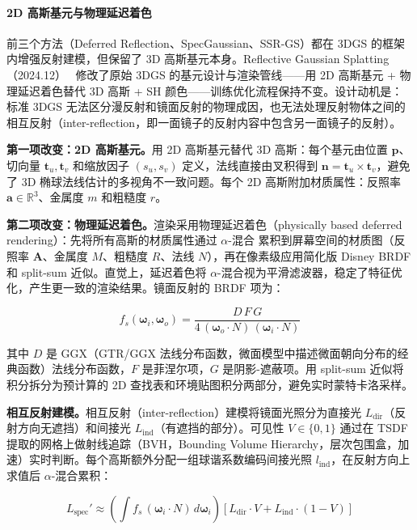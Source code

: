 \paragraph{2D 高斯基元与物理延迟着色}

前三个方法（Deferred Reflection、SpecGaussian、SSR-GS）都在 3DGS 的框架内增强反射建模，但保留了 3D 高斯基元本身。Reflective Gaussian Splatting（2024.12）~\cite{2412_19282} 修改了原始 3DGS 的基元设计与渲染管线——用 2D 高斯基元 + 物理延迟着色替代 3D 高斯 + SH 颜色——训练优化流程保持不变。设计动机是：标准 3DGS 无法区分漫反射和镜面反射的物理成因，也无法处理反射物体之间的相互反射（inter-reflection，即一面镜子的反射内容中包含另一面镜子的反射）。

\textbf{第一项改变：2D 高斯基元。}用 2D 高斯基元替代 3D 高斯：每个基元由位置 $\mathbf{p}$、切向量 $\mathbf{t}_u, \mathbf{t}_v$ 和缩放因子 $(s_u, s_v)$ 定义，法线直接由叉积得到 $\mathbf{n} = \mathbf{t}_u \times \mathbf{t}_v$，避免了 3D 椭球法线估计的多视角不一致问题。每个 2D 高斯附加材质属性：反照率 $\mathbf{a} \in \mathbb{R}^3$、金属度 $m$ 和粗糙度 $r$。

\textbf{第二项改变：物理延迟着色。}渲染采用物理延迟着色（physically based deferred rendering）：先将所有高斯的材质属性通过 $\alpha$-混合 累积到屏幕空间的材质图（反照率 $\mathbf{A}$、金属度 $M$、粗糙度 $R$、法线 $N$），再在像素级应用简化版 Disney BRDF 和 split-sum 近似。直觉上，延迟着色将 $\alpha$-混合视为平滑滤波器，稳定了特征优化，产生更一致的渲染结果。镜面反射的 BRDF 项为：

\begin{equation}
f_s(\boldsymbol{\omega}_i, \boldsymbol{\omega}_o) = \frac{D \, F \, G}{4 \, (\boldsymbol{\omega}_o \cdot N) \, (\boldsymbol{\omega}_i \cdot N)}
\end{equation}

其中 $D$ 是 GGX（GTR/GGX 法线分布函数，微面模型中描述微面朝向分布的经典函数）法线分布函数，$F$ 是菲涅尔项，$G$ 是阴影-遮蔽项。用 split-sum 近似将积分拆分为预计算的 2D 查找表和环境贴图积分两部分，避免实时蒙特卡洛采样。

\textbf{相互反射建模。}相互反射（inter-reflection）建模将镜面光照分为直接光 $L_{\text{dir}}$（反射方向无遮挡）和间接光 $L_{\text{ind}}$（有遮挡的部分）。可见性 $V \in \{0, 1\}$ 通过在 TSDF 提取的网格上做射线追踪（BVH，Bounding Volume Hierarchy，层次包围盒，加速）实时判断。每个高斯额外分配一组球谐系数编码间接光照 $l_{\text{ind}}$，在反射方向上求值后 $\alpha$-混合累积：

\begin{equation}
L_{\text{spec}}' \approx \left(\int f_s \, (\boldsymbol{\omega}_i \cdot N) \, d\boldsymbol{\omega}_i\right) \left[ L_{\text{dir}} \cdot V + L_{\text{ind}} \cdot (1 - V) \right]
\end{equation}

